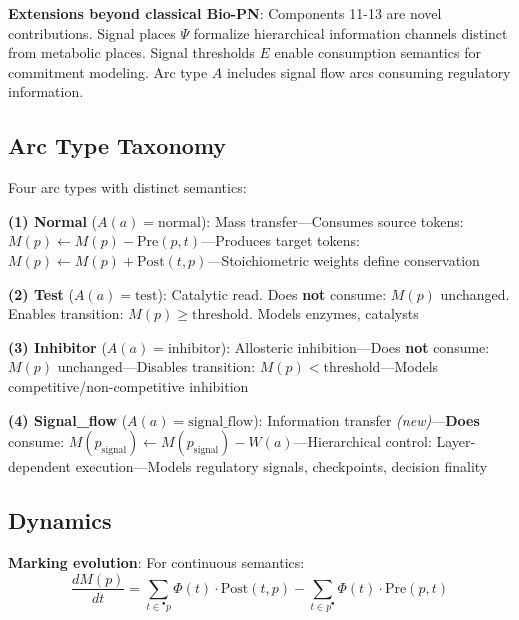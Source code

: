 \vspace{3pt}
\noindent\textbf{Extensions beyond classical Bio-PN}: Components 11-13 are novel contributions. Signal places $\Psi$ formalize hierarchical information channels distinct from metabolic places. Signal thresholds $E$ enable consumption semantics for commitment modeling. Arc type $A$ includes signal flow arcs consuming regulatory information.

\subsection{Arc Type Taxonomy}

\vspace{3pt}
\noindent Four arc types with distinct semantics:

\vspace{3pt}
\noindent\textbf{(1) Normal} ($A(a) = \text{normal}$): Mass transfer---Consumes source tokens: $M(p) \gets M(p) - \text{Pre}(p, t)$---Produces target tokens: $M(p) \gets M(p) + \text{Post}(t, p)$---Stoichiometric weights define conservation

\vspace{3pt}
\noindent\textbf{(2) Test} ($A(a) = \text{test}$): Catalytic read. Does \textbf{not} consume: $M(p)$ unchanged. Enables transition: $M(p) \geq \text{threshold}$. Models enzymes, catalysts

\vspace{3pt}
\noindent\textbf{(3) Inhibitor} ($A(a) = \text{inhibitor}$): Allosteric inhibition---Does \textbf{not} consume: $M(p)$ unchanged---Disables transition: $M(p) < \text{threshold}$---Models competitive/non-competitive inhibition

\vspace{3pt}
\noindent\textbf{(4) Signal\_flow} ($A(a) = \text{signal\_flow}$): Information transfer \textit{(new)}---\textbf{Does} consume: $M(p_{\text{signal}}) \gets M(p_{\text{signal}}) - W(a)$---Hierarchical control: Layer-dependent execution---Models regulatory signals, checkpoints, decision finality

\subsection{Dynamics}

\vspace{3pt}
\noindent\textbf{Marking evolution}: For continuous semantics:
\begin{equation}
\label{eq:marking_evolution}
\frac{dM(p)}{dt} = \sum_{t \in {}^\bullet p} \Phi(t) \cdot \text{Post}(t, p) - \sum_{t \in p^\bullet} \Phi(t) \cdot \text{Pre}(p, t)
\end{equation}

